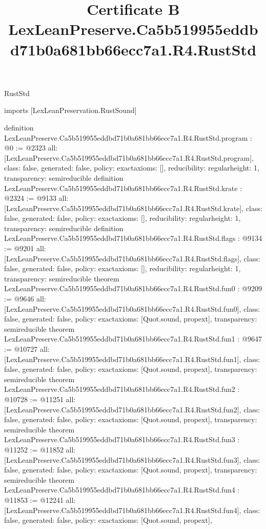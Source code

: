 \begin{lexlean}{RustStd}
\title{Certificate B LexLeanPreserve.Ca5b519955eddbd71b0a681bb66ecc7a1.R4.RustStd}
\begin{coremodule}
imports [LexLeanPreservation.RustSound]

definition LexLeanPreserve.Ca5b519955eddbd71b0a681bb66ecc7a1.R4.RustStd.program : @0 := @2323 {
  all: [LexLeanPreserve.Ca5b519955eddbd71b0a681bb66ecc7a1.R4.RustStd.program],
  class: false,
  generated: false,
  policy: exact{axioms: []},
  reducibility: regular{height: 1},
  transparency: semireducible
}
definition LexLeanPreserve.Ca5b519955eddbd71b0a681bb66ecc7a1.R4.RustStd.krate : @2324 := @9133 {
  all: [LexLeanPreserve.Ca5b519955eddbd71b0a681bb66ecc7a1.R4.RustStd.krate],
  class: false,
  generated: false,
  policy: exact{axioms: []},
  reducibility: regular{height: 1},
  transparency: semireducible
}
definition LexLeanPreserve.Ca5b519955eddbd71b0a681bb66ecc7a1.R4.RustStd.flags : @9134 := @9201 {
  all: [LexLeanPreserve.Ca5b519955eddbd71b0a681bb66ecc7a1.R4.RustStd.flags],
  class: false,
  generated: false,
  policy: exact{axioms: []},
  reducibility: regular{height: 1},
  transparency: semireducible
}
theorem LexLeanPreserve.Ca5b519955eddbd71b0a681bb66ecc7a1.R4.RustStd.fun0 : @9209 := @9646 {
  all: [LexLeanPreserve.Ca5b519955eddbd71b0a681bb66ecc7a1.R4.RustStd.fun0],
  class: false,
  generated: false,
  policy: exact{axioms: [Quot.sound, propext]},
  transparency: semireducible
}
theorem LexLeanPreserve.Ca5b519955eddbd71b0a681bb66ecc7a1.R4.RustStd.fun1 : @9647 := @10727 {
  all: [LexLeanPreserve.Ca5b519955eddbd71b0a681bb66ecc7a1.R4.RustStd.fun1],
  class: false,
  generated: false,
  policy: exact{axioms: [Quot.sound, propext]},
  transparency: semireducible
}
theorem LexLeanPreserve.Ca5b519955eddbd71b0a681bb66ecc7a1.R4.RustStd.fun2 : @10728 := @11251 {
  all: [LexLeanPreserve.Ca5b519955eddbd71b0a681bb66ecc7a1.R4.RustStd.fun2],
  class: false,
  generated: false,
  policy: exact{axioms: [Quot.sound, propext]},
  transparency: semireducible
}
theorem LexLeanPreserve.Ca5b519955eddbd71b0a681bb66ecc7a1.R4.RustStd.fun3 : @11252 := @11852 {
  all: [LexLeanPreserve.Ca5b519955eddbd71b0a681bb66ecc7a1.R4.RustStd.fun3],
  class: false,
  generated: false,
  policy: exact{axioms: [Quot.sound, propext]},
  transparency: semireducible
}
theorem LexLeanPreserve.Ca5b519955eddbd71b0a681bb66ecc7a1.R4.RustStd.fun4 : @11853 := @12241 {
  all: [LexLeanPreserve.Ca5b519955eddbd71b0a681bb66ecc7a1.R4.RustStd.fun4],
  class: false,
  generated: false,
  policy: exact{axioms: [Quot.sound, propext]},
}
\end{coremodule}
\end{lexlean}
